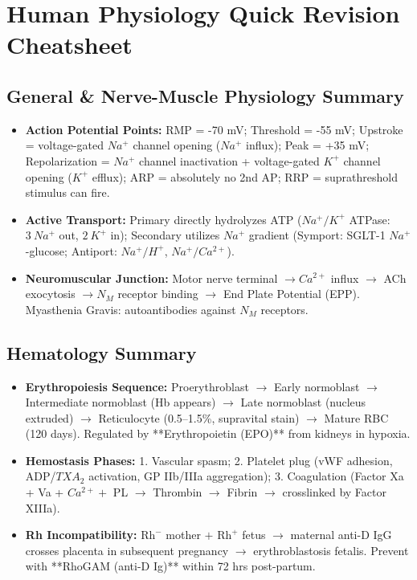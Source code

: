 \documentclass[11pt,a4paper]{article}
\begin{document}
\newpage
\appendix
\section{Human Physiology Quick Revision Cheatsheet}

\subsection{General \& Nerve-Muscle Physiology Summary}
\begin{itemize}[leftmargin=*]
    \item \textbf{Action Potential Points:} RMP = -70 mV; Threshold = -55 mV; Upstroke = voltage-gated $Na^+$ channel opening ($Na^+$ influx); Peak = +35 mV; Repolarization = $Na^+$ channel inactivation + voltage-gated $K^+$ channel opening ($K^+$ efflux); ARP = absolutely no 2nd AP; RRP = suprathreshold stimulus can fire.
    \item \textbf{Active Transport:} Primary directly hydrolyzes ATP ($Na^+/K^+$ ATPase: $3\ Na^+$ out, $2\ K^+$ in); Secondary utilizes $Na^+$ gradient (Symport: SGLT-1 $Na^+$-glucose; Antiport: $Na^+/H^+$, $Na^+/Ca^{2+}$).
    \item \textbf{Neuromuscular Junction:} Motor nerve terminal $\rightarrow Ca^{2+}$ influx $\rightarrow$ ACh exocytosis $\rightarrow N_M$ receptor binding $\rightarrow$ End Plate Potential (EPP). Myasthenia Gravis: autoantibodies against $N_M$ receptors.
\end{itemize}

\subsection{Hematology Summary}
\begin{itemize}[leftmargin=*]
    \item \textbf{Erythropoiesis Sequence:} Proerythroblast $\rightarrow$ Early normoblast $\rightarrow$ Intermediate normoblast (Hb appears) $\rightarrow$ Late normoblast (nucleus extruded) $\rightarrow$ Reticulocyte (0.5--1.5\%, supravital stain) $\rightarrow$ Mature RBC (120 days). Regulated by **Erythropoietin (EPO)** from kidneys in hypoxia.
    \item \textbf{Hemostasis Phases:} 1. Vascular spasm; 2. Platelet plug (vWF adhesion, ADP/$TXA_2$ activation, GP IIb/IIIa aggregation); 3. Coagulation (Factor Xa + Va + $Ca^{2+} +$ PL $\rightarrow$ Thrombin $\rightarrow$ Fibrin $\rightarrow$ crosslinked by Factor XIIIa).
    \item \textbf{Rh Incompatibility:} $\text{Rh}^-$ mother $+$ $\text{Rh}^+$ fetus $\rightarrow$ maternal anti-D IgG crosses placenta in subsequent pregnancy $\rightarrow$ erythroblastosis fetalis. Prevent with **RhoGAM (anti-D Ig)** within 72 hrs post-partum.
\end{itemize}
\end{document}
